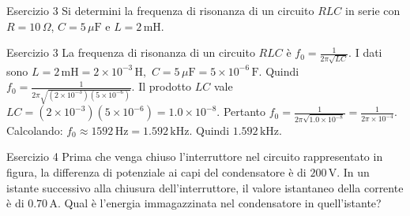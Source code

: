\documentclass[a4paper]{article}
\begin{document}
\begin{snippetexercise}{Esercizio 3}
    Si determini la frequenza di risonanza di un circuito \(RLC\) in serie con
    \(R = 10\,\Omega\), \(C = 5\,\mu\mathrm{F}\) e
    \(L = 2\,\mathrm{mH}\).

\end{snippetexercise}
\begin{snippetsolution}{Esercizio 3}
    La frequenza di risonanza di un circuito \(RLC\) è
    \(f_0 = \frac{1}{2\pi\sqrt{LC}}.\)
    I dati sono
    \(L = 2\,\mathrm{mH} = 2 \times 10^{-3}\,\mathrm{H},\)
    \(C = 5\,\mu\mathrm{F} = 5 \times 10^{-6}\,\mathrm{F}.\)
    Quindi
    \(f_0 = \frac{1} { 2\pi \sqrt{ \left(2 \times 10^{-3}\right) \left(5 \times 10^{-6}\right) } }.\)
    Il prodotto \(LC\) vale
    \(LC = \left(2 \times 10^{-3}\right) \left(5 \times 10^{-6}\right) = 1.0 \times 10^{-8}.\)
    Pertanto
    \(f_0 = \frac{1} {2\pi\sqrt{1.0 \times 10^{-8}}} = \frac{1}{2\pi \times 10^{-4}}.\)
    Calcolando:
    \(f_0 \approx 1592\,\mathrm{Hz} = 1.592\,\mathrm{kHz}.\)
    Quindi
    \(\boxed{1.592\,\mathrm{kHz}}.\)
\end{snippetsolution}
\begin{snippetexercise}{Esercizio 4}
    Prima che venga chiuso l'interruttore nel circuito rappresentato in figura,
    la differenza di potenziale ai capi del condensatore è di \(200\,\mathrm{V}\).
    In un istante successivo alla chiusura dell'interruttore, il valore
    istantaneo della corrente è di \(0.70\,\mathrm{A}\). Qual è l'energia
    immagazzinata nel condensatore in quell'istante?
    \begin{center}
    \end{center}

\end{snippetexercise}
\end{document}
